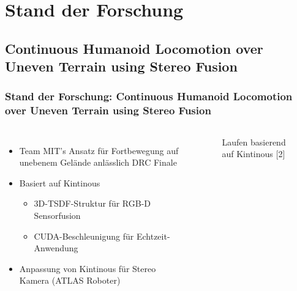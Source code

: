 \section{Stand der Forschung} 


\subsection*{Continuous Humanoid Locomotion over Uneven Terrain using Stereo Fusion}

    \begin{frame}[t]
    \frametitle{Stand der Forschung: Continuous Humanoid Locomotion over Uneven Terrain using Stereo Fusion}

    \begin{columns}[t]
      \column[]{6cm}
      
      \begin{itemize}
      \item Team MIT's Ansatz für Fortbewegung auf unebenem Gelände anlässlich DRC Finale
      \item Basiert auf Kintinous
      \begin{itemize}
       \item 3D-TSDF-Struktur für RGB-D Sensorfusion
       \item CUDA-Beschleunigung für Echtzeit-Anwendung
      \end{itemize}

      \item Anpassung von Kintinous für Stereo Kamera (ATLAS Roboter)

     \end{itemize}
     

      \column{6cm}
      
       \begin{figure}[h]
 	\centering
 	\caption{Laufen basierend auf Kintinous [2]} 
       \end{figure}
  
    \end{columns}
    \end{frame}

